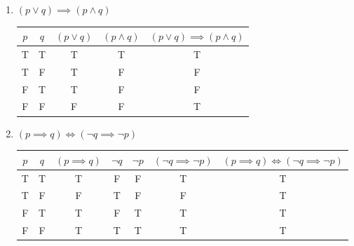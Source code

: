 \documentclass{article}
\begin{document}
\begin{enumerate}[label = \boldalph]
	\item $ \left( p \lor q \right) \implies \left( p \land q \right) $ \\
	      \begin{tabular}{ | c | c | c | c | c | }
		      $ p $ & $ q $ & $ \left( p \lor q \right) $ & $ \left( p \land q \right) $ & $ \left( p \lor q \right) \implies \left( p \land q \right) $ \\
		      \hline
		      T     & T     & T                           & T                            & T                                                             \\
		      T     & F     & T                           & F                            & F                                                             \\
		      F     & T     & T                           & F                            & F                                                             \\
		      F     & F     & F                           & F                            & T                                                             \\
	      \end{tabular}

	\item $ \left( p \implies q \right) \iff \left( \neg q \implies \neg p \right) $ \\
	      \begin{tabular}{ | c | c | c | c | c | c | c | }
		      $ p $ & $ q $ & $ \left( p \implies q \right) $ & $ \neg q $ & $ \neg p $ & $ \left( \neg q \implies \neg p \right) $ & $ \left( p \implies q \right) \iff \left( \neg q \implies \neg p \right) $ \\
		      \hline
		      T     & T     & T                               & F          & F          & T                                         & T                                                                          \\
		      T     & F     & F                               & T          & F          & F                                         & T                                                                          \\
		      F     & T     & T                               & F          & T          & T                                         & T                                                                          \\
		      F     & F     & T                               & T          & T          & T                                         & T                                                                          \\
	      \end{tabular}


\end{enumerate}
\end{document}
